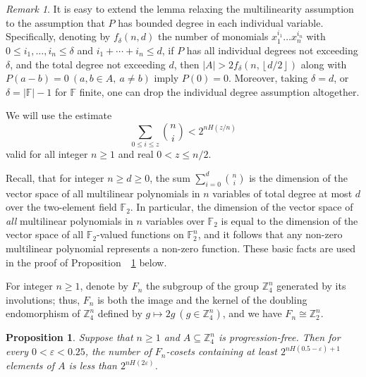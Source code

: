 \documentclass[12pt,reqno]{amsart}
\newcommand{\del}{\delta}
\newcommand{\eps}{\varepsilon}
\newcommand{\F}{{\mathbb F}}
\newcommand{\Z}{{\mathbb Z}}
\newcommand{\lfl}{\left\lfloor}
\newcommand{\rfl}{\right\rfloor}
\newcommand{\<}{\langle}
\renewcommand{\>}{\rangle}
\newcommand{\seq}{\subseteq}
\newcommand{\longc}{,\ldots,}
\newcommand{\longp}{+\dotsb+}
\newtheorem{proposition}{Proposition}
\newcommand{\refp}[1]{~\ref{p:#1}}
\theoremstyle{remark}
\newtheorem*{remark}{Remark}
\begin{document}
\begin{remark}
It is easy to extend the lemma relaxing the multilinearity assumption to the
assumption that $P$ has bounded degree in each individual variable.
Specifically, denoting by $f_\del(n,d)$ the number of monomials
$x_1^{i_1}\dotsc x_n^{i_n}$ with $0\le i_1\longc i_n\le\del$ and
 $i_1\longp i_n\le d$, if $P$ has all individual degrees not exceeding $\del$,
and the total degree not exceeding $d$, then $|A|>2f_\del(n,\lfl d/2\rfl)$
along with $P(a-b)=0\ (a,b\in A,\ a\ne b)$ imply $P(0)=0$. Moreover, taking
$\del=d$, or $\del=|\F|-1$ for $\F$ finite, one can drop the individual
degree assumption altogether.
\end{remark}

We will use the estimate
\begin{equation}\label{e:binom}
  \sum_{0\le i\le z} \binom ni < 2^{nH(z/n)}
\end{equation}
valid for all integer $n\ge 1$ and real $0<z\le n/2$.

Recall, that for integer $n\ge d\ge 0$, the sum $\sum_{i=0}^d\binom ni$ is
the dimension of the vector space of all multilinear polynomials in $n$
variables of total degree at most $d$ over the two-element field $\F_2$. In
particular, the dimension of the vector space of \emph{all} multilinear
polynomials in $n$ variables over $\F_2$ is equal to the dimension of the
vector space of all $\F_2$-valued functions on $\F_2^n$, and it follows that
any non-zero multilinear polynomial represents a non-zero function. These
basic facts are used in the proof of Proposition~\refp{richcosets} below.

For integer $n\ge 1$, denote by $F_n$ the subgroup of the group $\Z_4^n$
generated by its involutions; thus, $F_n$ is both the image and the kernel of
the doubling endomorphism of $\Z_4^n$ defined by $g\mapsto 2g\ (g\in\Z_4^n)$,
and we have $F_n\cong\Z_2^n$.

\begin{proposition}\label{p:richcosets}
Suppose that $n\ge 1$ and $A\seq\Z_4^n$ is progression-free. Then for every
$0<\eps<0.25$, the number of $F_n$-cosets containing at least
$2^{nH(0.5-\eps)+1}$ elements of $A$ is less than $2^{nH(2\eps)}$.
\end{proposition}
\end{document}

